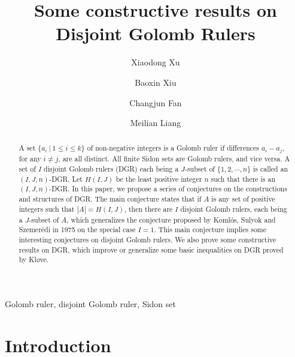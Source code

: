 \documentclass[preprint,12pt]{elsarticle}
\begin{document}
\begin{frontmatter}

\title{Some constructive results on Disjoint Golomb Rulers}


\author[asg]{Xiaodong Xu}
\author[ZS]{Baoxin Xiu}
\author[rvt]{Changjun Fan}
\author[els]{Meilian Liang}

\address[asg]{Guangxi Academy of Sciences, Nanning 530007, P.R.China.}
\address[ZS]{School of System Science and Engineering, Sun Yat-sen University, \\Guangzhou 510006, P.R. China}
\address[rvt]{The School of Information System and Management, National University of Defense Technology, Changsha 410073, P.R.China }
\address[els]{School of Mathematics and Information Science, Guangxi University,\\ Nanning 530004, P.R.China.}


\begin{abstract}
A set $\{a_i\:|\: 1\leq i \leq k\}$ of non-negative integers is a Golomb ruler if differences $a_i-a_j$, for any $i \neq j$, are all distinct.
All finite Sidon sets are Golomb rulers, and vice versa.
A set of  $I$ disjoint Golomb rulers (DGR) each being a $J$-subset of $\{1,2,\cdots, n\}$ is called an $(I,J,n)$-DGR. Let $H(I, J)$ be the least positive integer $n$ such that there is an $(I,J,n)$-DGR. In this paper, we propose a series of conjectures on the constructions and structures of DGR. The main conjecture states that if $A$ is any set of positive integers such that $|A| = H(I, J)$, then there are $I$ disjoint Golomb rulers, each being a $J$-subset of $A$,
which generalizes the conjecture proposed by Koml{\'o}s, Sulyok and Szemer{\'e}di in 1975 on the special case $I = 1$.
This main conjecture implies some interesting conjectures on disjoint Golomb rulers.
We also prove some constructive results on DGR, which improve or generalize some basic inequalities on DGR proved by Kl{\o}ve.
\end{abstract}

\begin{keyword}
Golomb ruler, disjoint Golomb ruler, Sidon set
\end{keyword}

\end{frontmatter}


\section{Introduction}\label{intro}
\end{document}
